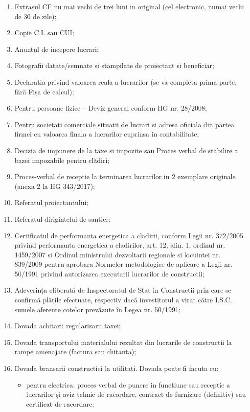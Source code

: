 \documentclass[11pt,a4paper]{article}
\begin{document}
\begin{enumerate}[leftmargin=*]
\item Extrasul CF nu mai vechi de trei luni in original (cel electronic, numai vechi de 30 de zile);
\item Copie C.I. sau CUI;
\item Anuntul de incepere lucrari;
\item Fotografii datate/semnate si stampilate de proiectant si beneficiar;
\item Declaratia privind valoarea reala a lucrarilor (se va completa prima parte, fără Fișa de calcul);
\item Pentru persoane fizice -- Deviz general conform HG nr. 28/2008;
\item Pentru societati comerciale situatii de lucrari si adresa oficiala din partea firmei cu valoarea finala a lucrarilor cuprinsa in contabilitate;
\item Decizia de impunere de la taxe si impozite sau Proces verbal de stabilire a bazei impozabile pentru clădiri;
\item Proces-verbal de receptie la terminarea lucrarilor in 2 exemplare originale (anexa 2 la HG 343/2017);
\item Referatul proiectantului;
\item Referatul dirigintelui de santier;
\item Certificatul de performanta energetica a cladirii, conform Legii nr. 372/2005 privind performanta energetica a cladirilor, art. 12, alin. 1, ordinul nr. 1459/2007 si Ordinul ministrului dezvoltarii regionale si locuintei nr. 839/2009 pentru aprobara Normelor metodologice de aplicare a Legii nr. 50/1991 privind autorizarea executarii lucrarilor de constructii;
\item Adeverința eliberată de Inspectoratul de Stat in Constructii prin care se confirmă plățile efectuate, respectiv dacă investitorul a virat către I.S.C. sumele aferente cotelor prevăzute în Legea nr. 50/1991;
\item Dovada achitarii regularizarii taxei;
\item Dovada transportului materialului rezultat din lucrarile de constructii la rampe amenajate (factura sau chitanta);
\item Dovada bransarii constructiei la utilitati. Dovada poate fi facuta cu:
\begin{itemize}
\item pentru electrica: proces verbal de punere in functiune sau receptie a lucrarilor și aviz tehnic de racordare, contract de furnizare (definitiv) sau certificat de racordare;

\end{itemize}
\end{enumerate}
\end{document}
